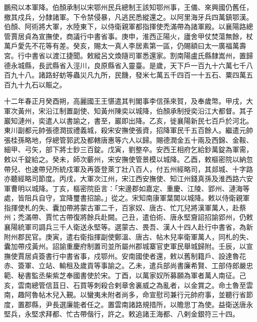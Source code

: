 \begin{pinyinscope}
鵬飛以本軍降。伯顏承制以宋鄂州民兵總制王該知鄂州事，王儀、來興國仍舊任，撤其戍兵，分隸諸軍。下令禁侵暴，凡逃民悉縱還之。以阿里海牙兵四萬鎮鄂漢。伯顏、阿術將大軍，水陸東下，以侍衛親軍都指揮使禿滿帶為諸軍殿。以襄陽路總管賈居貞為宣撫使，商議行中書省事。庚申，淮西正陽火，廬舍甲仗焚蕩無餘，杖萬戶愛先不花等有差。癸亥，賜太一真人李居素第一區，仍賜額曰太一廣福萬壽宮。行中書省以渡江捷聞。敕縱呂文煥隨司軍悉還家。割南陽盧氏縣隸嵩州，置歸德永城縣，長武縣省入涇川，良原縣省入靈臺。是歲，天下戶一百九十六萬七千八百九十八。諸路虸蚄等蟲災凡九所，民饑，發米七萬五千四百一十五石、粟四萬五百九十九石以賑之。



 十二年春正月癸酉朔，高麗國王王愖遣其判閣事李信孫來賀，及奉歲幣。甲戌，大軍次黃州，宋沿江制置副使、知黃州陳奕以城降，伯顏承制授奕沿江大都督。其子巖知漣州，奕遣人以書諭之，書至，巖即出降。乙亥，徙襄陽新民七百戶於河北。東川副都元帥張德潤拔禮義城，殺宋安撫使張資，招降軍民千五百餘人。繼遣元帥張桂孫略地，俘總管郭武及都轄唐惠等六人以歸。賜德潤金五十兩及西錦、金鞍、細甲、弓矢，部下將士鈔三百錠。戊寅，劉整卒。安西王相府乞給鈔萬錠為軍需，敕以千錠給之。癸未，師次蘄州，宋安撫使管景模以城降。乙酉，敕樞密院以納忽帶兒、也速帶兒所統戍軍及再簽登萊丁壯八百人，付五州經略司，其郯城、十字路亦聽經略司節度。丙戌，大軍次江州，宋江西安撫使、知江州錢真孫及淮西路六安軍曹明以城降。丁亥，樞密院臣言：「宋邊郡如嘉定、重慶、江陵、郢州、漣海等處，皆阻兵自守，宜降璽書招諭。」從之。宋知南康軍葉閶以城降。敕以侍衛親軍指揮使札的失、囊加帶將蒙古軍二千，百家奴、唐古、忙兀兒將漢軍萬人，赴蔡州；禿滿帶、賈忙古帶復將餘兵赴闕。己丑，遣伯術、唐永堅齎詔招諭郢州，仍敕襄陽統軍司調兵三千人衛送永堅等。選蒙古、畏吾、漢人十四人赴行中書省，為新附州郡民官。庚寅，遣右衛指揮副使鄭溫、唐古、帖木兒率衛軍萬人，同札的失、囊加帶戍黃州。詔諭重慶府制置司並所屬州郡城寨官吏軍民舉城歸附。壬辰，以宣撫使賈居貞簽書行中書省事，戍鄂州。安南國使者還，敕以舊制籍戶、設達魯花赤、簽軍、立站、輸租及歲貢等事諭之。乙未，遣兵部尚書廉希賢、工部侍郎嚴忠範、秘書監丞柴紫芝奉國書使於宋。丁酉，以萬家奴所募願為軍者萬人南征。己亥，雲南總管信苴日、石買等刺殺合剌章舍裏威之為亂者，以金賞之。命土魯至雲南，趣阿魯帖木兒入覲。以蠻夷未附者尚多，命宣慰司兼行元帥府事，並聽行省節度，置郡縣，尹長選廉能者任之。置雲南諸路規措所，以贍思丁為使。益衛送唐永堅兵，永堅求拜都、忙古帶偕行，許之。敕追諸王海都、八剌金銀符三十四。




\end{pinyinscope}
